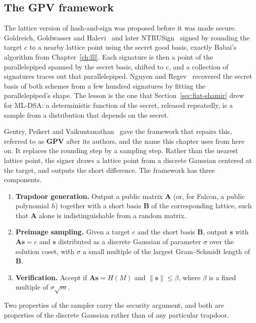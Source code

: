 \subsection{The GPV framework}
\label{sec:gpv}

The lattice version of hash-and-sign was proposed before it was made secure. Goldreich, Goldwasser and Halevi~\cite{ggh1997} and later NTRUSign~\cite{ntrusign2003} signed by rounding the target $c$ to a nearby lattice point using the secret good basis, exactly Babai's algorithm from Chapter~\ref{ch:lll}. Each signature is then a point of the parallelepiped spanned by the secret basis, shifted to $c$, and a collection of signatures traces out that parallelepiped. Nguyen and Regev~\cite{nguyenregev2006} recovered the secret basis of both schemes from a few hundred signatures by fitting the parallelepiped's shape. The lesson is the one that Section~\ref{sec:fiat-shamir} drew for ML-DSA: a deterministic function of the secret, released repeatedly, is a sample from a distribution that depends on the secret.

Gentry, Peikert and Vaikuntanathan~\cite{gpv2008} gave the framework that repairs this, referred to as \textbf{GPV} after its authors, and the name this chapter uses from here on. It replaces the rounding step by a sampling step. Rather than the nearest lattice point, the signer draws a lattice point from a discrete Gaussian centered at the target, and outputs the short difference. The framework has three components.

\begin{enumerate}
  \item \textbf{Trapdoor generation.} Output a public matrix $\mathbf{A}$ (or, for Falcon, a public polynomial $h$) together with a short basis $\mathbf{B}$ of the corresponding lattice, such that $\mathbf{A}$ alone is indistinguishable from a random matrix.
  \item \textbf{Preimage sampling.} Given a target $c$ and the short basis $\mathbf{B}$, output $\mathbf{s}$ with $\mathbf{A}\mathbf{s} = c$ and $\mathbf{s}$ distributed as a discrete Gaussian of parameter $\sigma$ over the solution coset, with $\sigma$ a small multiple of the largest Gram--Schmidt length of $\mathbf{B}$.
  \item \textbf{Verification.} Accept if $\mathbf{A}\mathbf{s} = H(M)$ and $\|\mathbf{s}\| \le \beta$, where $\beta$ is a fixed multiple of $\sigma\sqrt{m}$.
\end{enumerate}

Two properties of the sampler carry the security argument, and both are properties of the discrete Gaussian rather than of any particular trapdoor.

